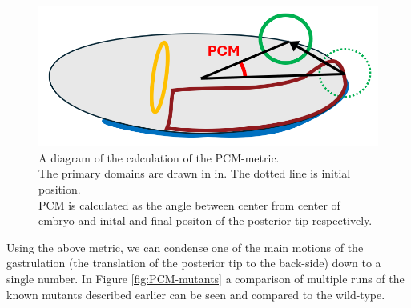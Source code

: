 \begin{figure}[H]
    \centering
    \includegraphics[width=0.75\linewidth]{chapters//Results//figures/PCM_diagram.png}
    \caption{A diagram of the calculation of the PCM-metric.\\
    The primary domains are drawn in in. The dotted line is initial position.\\
    PCM is calculated as the angle between center from center of embryo and inital and final positon of the posterior tip respectively.}
    \label{fig:PCM_diagram}
\end{figure}

Using the above metric, we can condense one of the main motions of the gastrulation (the translation of the posterior tip to the back-side) down to a single number. In Figure \ref{fig:PCM-mutants} a comparison of multiple runs of the known mutants described earlier can be seen and compared to the wild-type.

